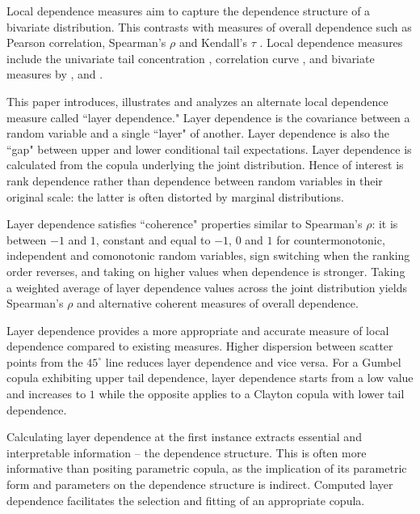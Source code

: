 \documentclass[authoryear]{elsarticle}
\begin{document}
Local dependence measures aim to capture the dependence structure of a bivariate distribution. This contrasts with  measures of overall dependence such as Pearson correlation, Spearman's $\rho$ and Kendall's $\tau$ \citep{embrechts2002correlation}. Local dependence measures include the univariate tail concentration \citep{venter2002tails}, correlation curve \citep{bjerve1993correlation}, and bivariate measures by \cite{bairamov2003new}, \cite{jones1996local} and \cite{holland1987dependence}.

This paper introduces, illustrates and analyzes an alternate local dependence measure called  ``layer dependence." Layer dependence is the covariance between a random variable and a single ``layer" of another. Layer dependence is also the ``gap" between upper and lower conditional tail expectations. Layer dependence is calculated  from the copula underlying the joint distribution.  Hence of interest is rank dependence rather than dependence between random variables in their original scale: the latter is often distorted by marginal distributions.


Layer dependence satisfies ``coherence" properties similar to Spearman's $\rho$: it is between $-1$ and $1$, constant and equal to $-1$, $0$ and $1$ for countermonotonic, independent and comonotonic random variables, sign switching when the ranking order reverses, and taking on higher values when dependence is stronger. Taking a weighted average of layer dependence values across the joint distribution yields Spearman's $\rho$ and alternative coherent measures of overall dependence.

Layer dependence provides a more appropriate and accurate measure of local dependence compared to existing measures. Higher dispersion between scatter points from the $45^\circ$ line reduces layer dependence and vice versa. For a Gumbel copula exhibiting upper tail dependence, layer dependence starts from a low value and increases to $1$ while the opposite applies to a Clayton copula with lower tail dependence.

Calculating layer dependence at the first instance extracts essential and interpretable information -- the dependence structure. This is often more informative than positing parametric copula, as the implication of its parametric form and parameters on the dependence structure is indirect. Computed layer dependence facilitates the selection and fitting of an appropriate copula.
\end{document}
